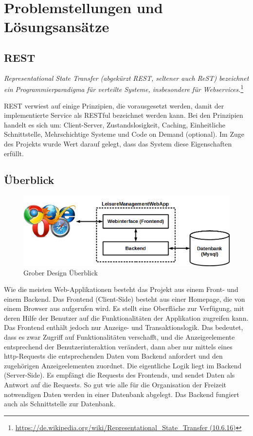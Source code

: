 \section{Problemstellungen und Lösungsansätze}

\subsection{REST}
\textit{Representational State Transfer (abgekürzt REST, seltener auch ReST) bezeichnet ein Programmierparadigma für verteilte Systeme, insbesondere für Webservices.}\vspace{5mm}\footnote{\url{https://de.wikipedia.org/wiki/Representational_State_Transfer (10.6.16)}}

REST verwiest auf einige Prinzipien, die vorausgesetzt werden, damit der implementierte Service als RESTful bezeichnet werden kann. Bei den Prinzipien handelt es sich um: Client-Server, Zustandslosigkeit, Caching, Einheitliche Schnittstelle, Mehrschichtige Systeme und Code on Demand (optional). Im Zuge des Projekts wurde Wert darauf gelegt, dass das System diese Eigenschaften erfüllt.

\subsection{Überblick}

\begin{figure}[h]
	\centering
	\includegraphics[width=0.7\linewidth]{2_solutions/pics/overview}
	\caption{Grober Design Überblick}
	\label{fig:overview}
\end{figure}

Wie die meisten Web-Applikationen besteht das Projekt aus einem Front- und einem Backend. Das Frontend (Client-Side) besteht aus einer Homepage, die von einem Browser aus aufgerufen wird. Es stellt eine Oberfläche zur Verfügung, mit deren Hilfe der Benutzer auf die Funktionalitäten der Applikation zugreifen kann. Das Frontend enthält jedoch nur Anzeige- und Transaktionslogik. Das bedeutet, dass es zwar Zugriff auf Funktionalitäten verschafft, und die Anzeigeelemente entsprechend der Benutzerinteraktion verändert, dann aber nur mittels eines http-Requests die entsprechenden Daten vom Backend anfordert und den zugehörigen Anzeigeelementen zuordnet. Die eigentliche Logik liegt im Backend (Server-Side). Es empfängt die Requests des Frontends, und sendet Daten als Antwort auf die Requests. So gut wie alle für die Organisation der Freizeit notwendigen Daten werden in einer Datenbank abgelegt. Das Backend fungiert auch als Schnittstelle zur Datenbank.   

